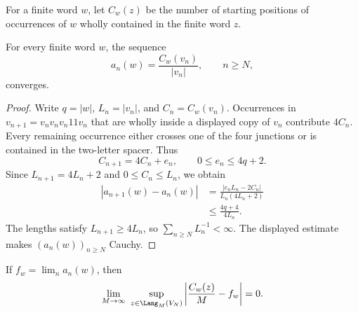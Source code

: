 For a finite word $w$, let $C_w(z)$ be the number of starting positions of
occurrences of $w$ wholly contained in the finite word $z$.

\begin{lemma}\label{lem:prefix-frequency}
For every finite word $w$, the sequence
\[
 a_n(w)=\frac{C_w(v_n)}{|v_n|},\qquad n\geq N,
\]
converges.
\end{lemma}

\begin{proof}
Write $q=|w|$, $L_n=|v_n|$, and $C_n=C_w(v_n)$.  Occurrences in
$v_{n+1}=v_nv_nv_n11v_n$ that are wholly inside a displayed copy of $v_n$
contribute $4C_n$.  Every remaining occurrence either crosses one of the four
junctions or is contained in the two-letter spacer.  Thus
\begin{equation}\label{eq:occurrence-recurrence}
 C_{n+1}=4C_n+e_n,\qquad 0\leq e_n\leq 4q+2.
\end{equation}
Since $L_{n+1}=4L_n+2$ and $0\leq C_n\leq L_n$, we obtain
\begin{align*}
 |a_{n+1}(w)-a_n(w)|
 &=\frac{|e_nL_n-2C_n|}{L_n(4L_n+2)}\\
 &\leq \frac{4q+4}{4L_n}.
\end{align*}
The lengths satisfy $L_{n+1}\geq4L_n$, so
$\sum_{n\geq N}L_n^{-1}<\infty$.  The displayed estimate makes
$(a_n(w))_{n\geq N}$ Cauchy.
\end{proof}

\begin{lemma}\label{lem:uniform-frequency}
If $f_w=\lim_n a_n(w)$, then
\begin{equation}\label{eq:uniform-frequency}
 \lim_{M\to\infty}\ 
 \sup_{z\in\Lang_M(V_N)}
 \left|\frac{C_w(z)}{M}-f_w\right|=0.
\end{equation}
\end{lemma}

